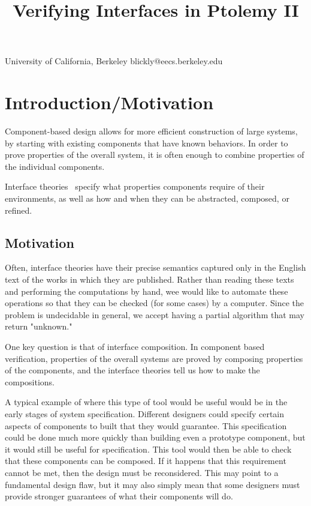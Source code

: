 \documentclass[preprint,11pt,authoryear]{sigplanconf}
\begin{document}
\title{Verifying Interfaces in Ptolemy II}

           {University of California, Berkeley}
           {blickly@eecs.berkeley.edu}

\maketitle

\newcommand{\fixme}[1]{\textcolor{red}{FIXME: #1}}

\begin{abstract}
\end{abstract}

\section{Introduction/Motivation}
Component-based design allows for more efficient construction of large systems, by starting with existing components that have known behaviors.  In order to prove properties of the overall system, it is often enough to combine properties of the individual components.

Interface theories~\cite{interfaceTheories} specify what properties components require of their environments, as well as how and when they can be abstracted, composed, or refined.
\subsection{Motivation}
Often, interface theories have their precise semantics captured only in the English text of the works in which they are published.
Rather than reading these texts and performing the computations by hand, wee would like to automate these operations so that they can be checked (for some cases) by a computer.
Since the problem is undecidable in general, we accept having a partial algorithm that may return "unknown."

One key question is that of interface composition.  In component based verification, properties of the overall systems are proved by composing properties of the components, and the interface theories tell us how to make the compositions.

A typical example of where this type of tool would be useful would be in the early stages of system specification.
Different designers could specify certain aspects of components to built that they would guarantee.
This specification could be done much more quickly than building even a prototype component, but it would still be useful for specification.
This tool would then be able to check that these components can be composed.
If it happens that this requirement cannot be met, then the design must be reconsidered.
This may point to a fundamental design flaw, but it may also simply mean that some designers must provide stronger guarantees of what their components will do.
\end{document}
